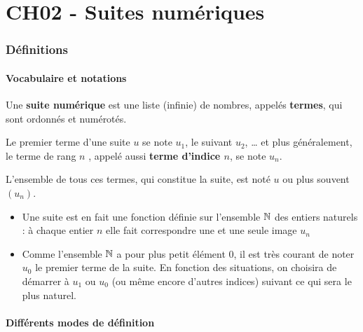 \documentclass[a4paper,11pt]{article}
\author{Pierquet}
\title{\nomfichier}
\begin{document}
\pagestyle{fancy}

\part{CH02 - Suites numériques}

\section{Définitions}

\subsection{Vocabulaire et notations}

\begin{cdefi}
Une \textbf{suite numérique} est une liste (infinie) de nombres, appelés \textbf{termes}, qui sont ordonnés et numérotés.

Le premier terme d'une suite $u$ se note $u_1$, le suivant $u_2$, \dots{} et plus généralement, le terme de rang $n$ , appelé aussi \textbf{terme d'indice $n$}, se note $u_n$.

L'ensemble de tous ces termes, qui constitue la suite, est noté $u$ ou plus souvent $(u_n)$.
\end{cdefi}

\begin{crmq}[s]
\begin{itemize}[leftmargin=*,topsep=0pt,parsep=0pt,partopsep=0pt]
	\item Une suite est en fait une fonction définie sur l'ensemble $\N$ des entiers naturels : à chaque entier $n$ elle fait correspondre une et une seule image $u_n$
	\item Comme l'ensemble $\N$ a pour plus petit élément 0, il est très courant de noter $u_0$ le premier terme de la suite. En fonction des situations, on choisira de démarrer à $u_1$ ou $u_0$ (ou même encore d'autres indices) suivant ce qui sera le plus naturel.
\end{itemize}
\end{crmq}

\subsection{Différents modes de définition}
\end{document}
